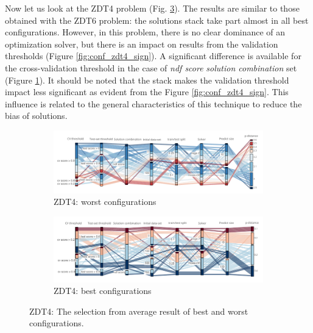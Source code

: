     Now let us look at the ZDT4 problem (Fig. \ref{fig:conf_zdt4}). The results are similar to those obtained with the ZDT6 problem: the solutions stack take part almost in all best configurations. However, in this problem, there is no clear dominance of an optimization solver, but there is an impact on results from the validation thresholds (Figure \ref{fig:conf_zdt4_sign}). 
    A significant difference is available for the cross-validation threshold in the case of \textit{ndf score} \emph{solution combination} set (Figure \ref{fig:conf_zdt4_worst}). It should be noted that the stack makes the validation threshold impact less significant as evident from the Figure \ref{fig:conf_zdt4_sign}. This influence is related to the general characteristics of this technique to reduce the bias of solutions.
        \begin{figure}
            \centering
            \begin{subfigure}{\textwidth}
                \includegraphics[width=\textwidth]{content/images/conf_zdt4_worst}
                \caption{ZDT4: worst configurations}
                \label{fig:conf_zdt4_worst}
            \end{subfigure} 
            \begin{subfigure}{\textwidth}
                \includegraphics[width=\textwidth]{content/images/conf_zdt4_best}
                \caption{ZDT4: best configurations}
                \label{fig:conf_zdt4_best}
            \end{subfigure} 
    
            \caption[ZDT4: The selection from average result of best and worst configurations.]{ZDT4: The selection from average result of best and worst configurations.}
            \label{fig:conf_zdt4}    
        \end{figure}
    
